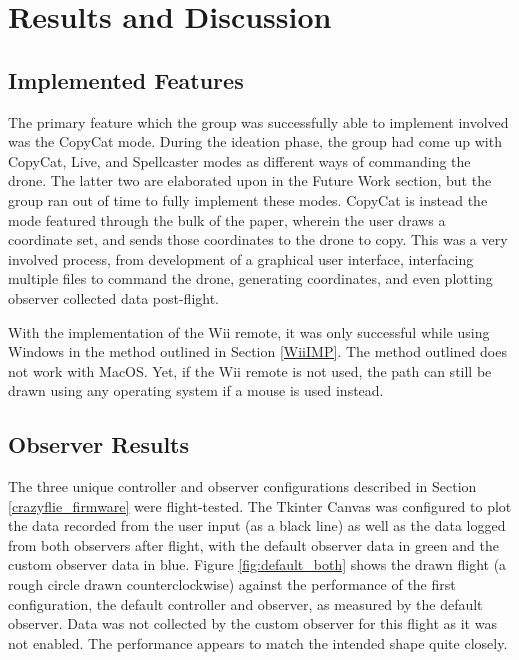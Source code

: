\documentclass[conf]{new-aiaa}
\begin{document}
\section{Results and Discussion}\label{results_discussion}

    \subsection{Implemented Features}
    
        The primary feature which the group was successfully able to implement involved was the CopyCat mode. During the ideation phase, the group had come up with CopyCat, Live, and Spellcaster modes as different ways of commanding the drone. The latter two are elaborated upon in the Future Work section, but the group ran out of time to fully implement these modes. CopyCat is instead the mode featured through the bulk of the paper, wherein the user draws a coordinate set, and sends those coordinates to the drone to copy. This was a very involved process, from development of a graphical user interface, interfacing multiple files to command the drone, generating coordinates, and even plotting observer collected data post-flight.
        
        With the implementation of the Wii remote, it was only successful while using Windows in the method outlined in Section \ref{WiiIMP}. The method outlined does not work with MacOS. Yet, if the Wii remote is not used, the path can still be drawn using any operating system if a mouse is used instead.
    
    \subsection{Observer Results}\label{obsv_results}
    
        The three unique controller and observer configurations described in Section \ref{crazyflie_firmware} were flight-tested. The Tkinter Canvas was configured to plot the data recorded from the user input (as a black line) as well as the data logged from both observers after flight, with the default observer data in green and the custom observer data in blue. Figure \ref{fig:default_both} shows the drawn flight (a rough circle drawn counterclockwise) against the performance of the first configuration, the default controller and observer, as measured by the default observer. Data was not collected by the custom observer for this flight as it was not enabled. The performance appears to match the intended shape quite closely.
        
\end{document}

